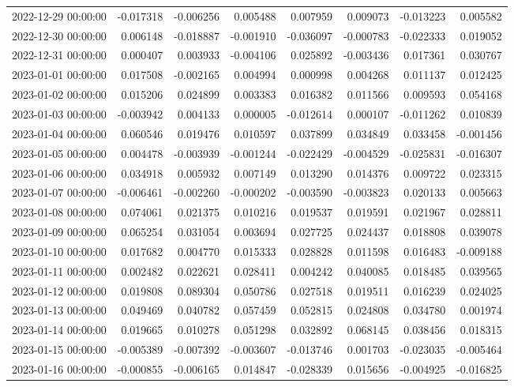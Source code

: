 \begin{tabular}{lrrrrrrr}
2022-12-29 00:00:00 & -0.017318 & -0.006256 & 0.005488 & 0.007959 & 0.009073 & -0.013223 & 0.005582 \\
2022-12-30 00:00:00 & 0.006148 & -0.018887 & -0.001910 & -0.036097 & -0.000783 & -0.022333 & 0.019052 \\
2022-12-31 00:00:00 & 0.000407 & 0.003933 & -0.004106 & 0.025892 & -0.003436 & 0.017361 & 0.030767 \\
2023-01-01 00:00:00 & 0.017508 & -0.002165 & 0.004994 & 0.000998 & 0.004268 & 0.011137 & 0.012425 \\
2023-01-02 00:00:00 & 0.015206 & 0.024899 & 0.003383 & 0.016382 & 0.011566 & 0.009593 & 0.054168 \\
2023-01-03 00:00:00 & -0.003942 & 0.004133 & 0.000005 & -0.012614 & 0.000107 & -0.011262 & 0.010839 \\
2023-01-04 00:00:00 & 0.060546 & 0.019476 & 0.010597 & 0.037899 & 0.034849 & 0.033458 & -0.001456 \\
2023-01-05 00:00:00 & 0.004478 & -0.003939 & -0.001244 & -0.022429 & -0.004529 & -0.025831 & -0.016307 \\
2023-01-06 00:00:00 & 0.034918 & 0.005932 & 0.007149 & 0.013290 & 0.014376 & 0.009722 & 0.023315 \\
2023-01-07 00:00:00 & -0.006461 & -0.002260 & -0.000202 & -0.003590 & -0.003823 & 0.020133 & 0.005663 \\
2023-01-08 00:00:00 & 0.074061 & 0.021375 & 0.010216 & 0.019537 & 0.019591 & 0.021967 & 0.028811 \\
2023-01-09 00:00:00 & 0.065254 & 0.031054 & 0.003694 & 0.027725 & 0.024437 & 0.018808 & 0.039078 \\
2023-01-10 00:00:00 & 0.017682 & 0.004770 & 0.015333 & 0.028828 & 0.011598 & 0.016483 & -0.009188 \\
2023-01-11 00:00:00 & 0.002482 & 0.022621 & 0.028411 & 0.004242 & 0.040085 & 0.018485 & 0.039565 \\
2023-01-12 00:00:00 & 0.019808 & 0.089304 & 0.050786 & 0.027518 & 0.019511 & 0.016239 & 0.024025 \\
2023-01-13 00:00:00 & 0.049469 & 0.040782 & 0.057459 & 0.052815 & 0.024808 & 0.034780 & 0.001974 \\
2023-01-14 00:00:00 & 0.019665 & 0.010278 & 0.051298 & 0.032892 & 0.068145 & 0.038456 & 0.018315 \\
2023-01-15 00:00:00 & -0.005389 & -0.007392 & -0.003607 & -0.013746 & 0.001703 & -0.023035 & -0.005464 \\
2023-01-16 00:00:00 & -0.000855 & -0.006165 & 0.014847 & -0.028339 & 0.015656 & -0.004925 & -0.016825 \\

\end{tabular}
